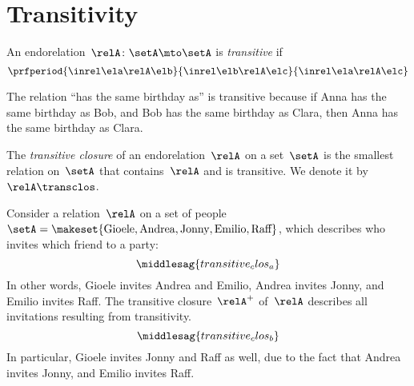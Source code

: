 
\section{Transitivity}

\begin{ctdefinition}
    \label{def:endo_transitive}
    An endorelation~$\relA\colon \setA\mto \setA$ is \emph{transitive} if
    \begin{equation*}
        \prfperiod{
            \inrel \ela \relA \elb
        }{
            \inrel \elb \relA \elc
        }{
            \inrel \ela \relA \elc
        }
    \end{equation*}
\end{ctdefinition}

\begin{example}
    The relation ``has the same birthday as'' is transitive because if Anna has the same birthday as Bob, and Bob has the same birthday as Clara, then Anna has the same birthday as Clara.
\end{example}

\begin{ctdefinition}
    \label{def:transitive-closure}
    The \emph{transitive closure} of an endorelation~$\relA$ on a set~$\setA$ is the smallest relation on~$\setA$ that contains~$\relA$ and is transitive.
    We denote it by~$\relA\transclos$.
\end{ctdefinition}


\begin{example}
    \label{exa:party}
    Consider a relation~$\relA$ on a set of people~$\setA=\makeset{\text{Gioele}, \text{Andrea}, \text{Jonny}, \text{Emilio}, \text{Raff}}$, which describes who invites which friend to a party:
    \begin{equation}
        \label{eq:transitive_clos_a}
        \middlesag{transitive_clos_a}
    \end{equation}
    In other words, Gioele invites Andrea and Emilio, Andrea invites Jonny, and Emilio invites Raff.
    The transitive closure~$\relA^+$ of~$\relA$ describes all invitations resulting from transitivity.
    \begin{equation}
        \label{eq:transitive_clos_b}
        \middlesag{transitive_clos_b}
    \end{equation}
    In particular, Gioele invites Jonny and Raff as well, due to the fact that Andrea invites Jonny, and Emilio invites Raff.
\end{example}

